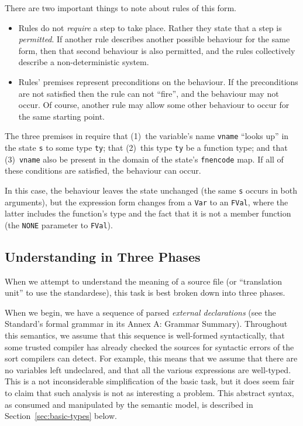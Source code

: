\documentclass[11pt]{article}
\begin{document}
There are two important things to note about rules of this form.
\begin{itemize}
\item Rules do not \emph{require} a step to take place.  Rather they
  state that a step is \emph{permitted}.  If another rule describes
  another possible behaviour for the same form, then that second
  behaviour is also permitted, and the rules collectively describe a
  non-deterministic system.
\item Rules' premises represent preconditions on the behaviour.  If
  the preconditions are not satisfied then the rule can not ``fire'',
  and the behaviour may not occur.  Of course, another rule may allow
  some other behaviour to occur for the same starting point.
\end{itemize}

The three premises in  require that (1)~the
variable's name \texttt{vname} ``looks up'' in the state \texttt{s} to
some type \texttt{ty}; that (2)~this type \texttt{ty} be a function
type; and that (3)~\texttt{vname} also be present in the domain of the
state's \texttt{fnencode} map.  If all of these conditions are
satisfied, the behaviour can occur.

In this case, the behaviour leaves the state unchanged (the same
\texttt{s} occurs in both arguments), but the expression form changes
from a \texttt{Var} to an \texttt{FVal}, where the latter includes the
function's type and the fact that it is not a member function (the
\texttt{NONE} parameter to \texttt{FVal}).



\subsection{Understanding \cpp{} in Three Phases}
\label{sec:intro-three-phases}

When we attempt to understand the meaning of a \cpp{} source file (or
``translation unit'' to use the standardese), this task is best broken
down into three phases.

When we begin, we have a sequence of parsed \emph{external
  declarations} (see the Standard's formal grammar in its Annex A:
Grammar Summary).  Throughout this semantics, we assume that this
sequence is well-formed syntactically, that some trusted compiler has
already checked the sources for syntactic errors of the sort compilers
can detect.  For example, this means that we assume that there are no
variables left undeclared, and that all the various expressions are
well-typed.  This is a not inconsiderable simplification of the basic
task, but it does seem fair to claim that such analysis is not as
interesting a problem.  This abstract syntax, as consumed and
manipulated by the semantic model, is described in
Section~\ref{sec:basic-types} below.
\end{document}
